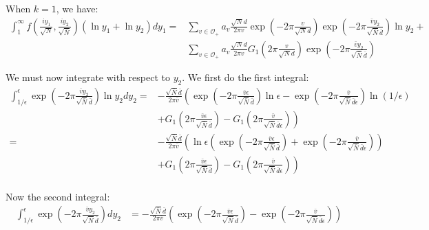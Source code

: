\documentclass{article}
\theoremstyle{plain}
\begin{document}
When $k=1$, we have:
\begin{align*}
\int_{1}^{\infty} f\left(\frac{iy_1}{\sqrt{N}},\frac{iy_2}{\sqrt{\bar{N}}}\right) (\ln y_1+\ln y_2) dy_1
= & \sum_{v \in \mathcal{O}_+} a_v \frac{\sqrt{N}d}{2 \pi v} \exp\left( -2\pi \frac{v}{\sqrt{N} d}\right)  \exp \left( -2\pi \frac{\bar{v} y_2}{\sqrt{\bar{N}}\bar{d}}\right) \ln y_2 + \\
& \sum_{v \in \mathcal{O}_+} a_v \frac{\sqrt{N}d}{2 \pi v} G_1\left( 2\pi \frac{v}{\sqrt{N} d}\right) \exp \left( -2\pi \frac{\bar{v} y_2}{\sqrt{\bar{N}}\bar{d}}\right)
\end{align*}

We must now integrate with respect to $y_2$. We first do the first integral:
\begin{align*}
\int_{1/\epsilon}^{\epsilon} \exp \left( -2\pi \frac{\bar{v} y_2}{\sqrt{\bar{N}}\bar{d}}\right) \ln y_2 dy_2
 = & -\frac{\sqrt{\bar{N}}\bar{d}}{2 \pi\bar{v}} \left( \exp \left( -2\pi \frac{\bar{v} \epsilon}{\sqrt{\bar{N}}\bar{d}}\right) \ln \epsilon -  \exp \left( -2\pi \frac{\bar{v} }{\sqrt{\bar{N}}\bar{d}\epsilon}\right) \ln(1/\epsilon) \right. \\
 & + \left. G_1\left(2\pi \frac{\bar{v} \epsilon}{\sqrt{\bar{N}}\bar{d}}\right)-G_1\left( 2\pi \frac{\bar{v} }{\sqrt{\bar{N}}\bar{d}\epsilon}\right) \right)\\
= & -\frac{\sqrt{\bar{N}}\bar{d}}{2 \pi\bar{v}} \left( \ln \epsilon \left( \exp \left( -2\pi \frac{\bar{v} \epsilon}{\sqrt{\bar{N}}\bar{d}}\right) +  \exp \left( -2\pi \frac{\bar{v} }{\sqrt{\bar{N}}\bar{d}\epsilon}\right) \right) \right. \\
 & + \left. G_1\left(2\pi \frac{\bar{v} \epsilon}{\sqrt{\bar{N}}\bar{d}}\right)-G_1\left( 2\pi \frac{\bar{v} }{\sqrt{\bar{N}}\bar{d}\epsilon}\right) \right)\\
\end{align*}

Now the second integral:
\begin{align*}
\int_{1/ \epsilon}^{\epsilon} \exp \left( -2\pi \frac{\bar{v} y_2}{\sqrt{\bar{N}}\bar{d}}\right) dy_2 
& =  - \frac{\sqrt{\bar{N}}\bar{d}}{2 \pi \bar{v}} \left( \exp \left( -2\pi \frac{\bar{v} \epsilon}{\sqrt{\bar{N}}\bar{d}}\right) -  \exp \left( -2\pi \frac{\bar{v} }{\sqrt{\bar{N}}\bar{d}\epsilon}\right)\right)
\end{align*}
\end{document}
